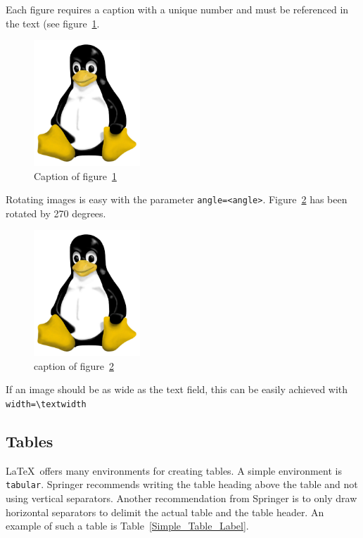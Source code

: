 \documentclass{llncs}
\begin{document}
Each figure requires a caption with a unique number and must be referenced in the text (see figure~\ref{Penguin_image_label}. 

\begin{figure}[htbp]
  \begin{center}
    \includegraphics[width=4cm]{images/Pinguin}
    \caption{Caption of figure~\ref{Penguin_image_label}}
    \label{Penguin_image_label} %
  \end{center}
\end{figure}

Rotating images is easy with the parameter \texttt{angle=<angle>}. Figure~\ref{Penguin_image_rotated_label} has been rotated by 270 degrees.

\begin{figure}[htbp]
  \begin{center}
    \includegraphics[width=4cm,angle=270]{images/Pinguin}
    \caption{caption of figure~\ref{Penguin_image_rotated_label}}
    \label{Penguin_image_rotated_label} %
  \end{center}
\end{figure}

If an image should be as wide as the text field, this can be easily achieved with \verb!width=\textwidth!

\subsection{Tables}

\LaTeX\ offers many environments for creating tables. A simple environment is \texttt{tabular}. Springer recommends writing the table heading above the table and not using vertical separators. Another recommendation from Springer is to only draw horizontal separators to delimit the actual table and the table header. An example of such a table is Table~\ref{Simple_Table_Label}.
\end{document}
